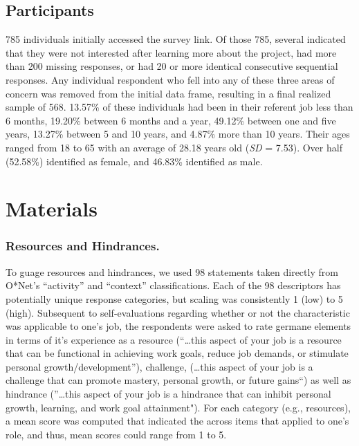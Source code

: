 \documentclass[
  english,
  man]{apa6}
\begin{document}
\hypertarget{participants}{%
\subsection{Participants}\label{participants}}

785 individuals initially accessed the survey link. Of those 785, several indicated that they were not interested after learning more about the project, had more than 200 missing responses, or had 20 or more identical consecutive sequential responses. Any individual respondent who fell into any of these three areas of concern was removed from the initial data frame, resulting in a final realized sample of 568. 13.57\% of these individuals had been in their referent job less than 6 months, 19.20\% between 6 months and a year, 49.12\% between one and five years, 13.27\% between 5 and 10 years, and 4.87\% more than 10 years. Their ages ranged from 18 to 65 with an average of 28.18 years old (\emph{SD} = 7.53). Over half (52.58\%) identified as female, and 46.83\% identified as male.

\hypertarget{materials}{%
\section{Materials}\label{materials}}

\hypertarget{resources-and-hindrances.}{%
\subsubsection{Resources and Hindrances.}\label{resources-and-hindrances.}}

To guage resources and hindrances, we used 98 statements taken directly from O*Net's ``activity'' and ``context'' classifications. Each of the 98 descriptors has potentially unique response categories, but scaling was consistently 1 (low) to 5 (high). Subsequent to self-evaluations regarding whether or not the characteristic was applicable to one's job, the respondents were asked to rate germane elements in terms of it's experience as a resource (``\ldots this aspect of your job is a resource that can be functional in achieving work goals, reduce job demands, or stimulate personal growth/development''), challenge, (\ldots this aspect of your job is a challenge that can promote mastery, personal growth, or future gains``) as well as hindrance (''\ldots this aspect of your job is a hindrance that can inhibit personal growth, learning, and work goal attainment"). For each category (e.g., resources), a mean score was computed that indicated the across items that applied to one's role, and thus, mean scores could range from 1 to 5.
\end{document}
